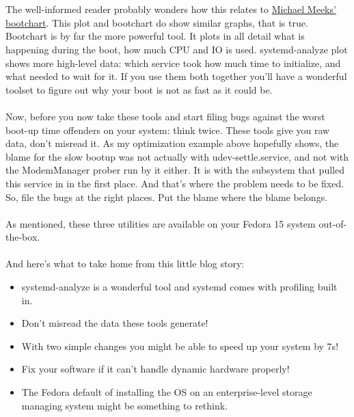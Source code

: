 \documentclass[titlepage]{article}
\begin{document}
\\
\\
The well-informed reader probably wonders how this relates to \href{https://github.com/mmeeks/bootchart}{Michael Meeks' bootchart}. This plot and bootchart do show similar graphs, that is true. Bootchart is by far the more powerful tool. It plots in all detail what is happening during the boot, how much CPU and IO is used. systemd-analyze plot shows more high-level data: which service took how much time to initialize, and what needed to wait for it. If you use them both together you'll have a wonderful toolset to figure out why your boot is not as fast as it could be.
\\
\\
Now, before you now take these tools and start filing bugs against the worst boot-up time offenders on your system: think twice. These tools give you raw data, don't misread it. As my optimization example above hopefully shows, the blame for the slow bootup was not actually with udev-settle.service, and not with the ModemManager prober run by it either. It is with the subsystem that pulled this service in in the first place. And that's where the problem needs to be fixed. So, file the bugs at the right places. Put the blame where the blame belongs.
\\
\\
As mentioned, these three utilities are available on your Fedora 15 system out-of-the-box.
\\
\\
And here's what to take home from this little blog story:
\begin{itemize}
\item
systemd-analyze is a wonderful tool and systemd comes with profiling built in.
\item
Don't misread the data these tools generate!
\item
With two simple changes you might be able to speed up your system by 7s!
\item
Fix your software if it can't handle dynamic hardware properly!
\item
The Fedora default of installing the OS on an enterprise-level storage managing system might be something to rethink.
\end{itemize}
\end{document}
